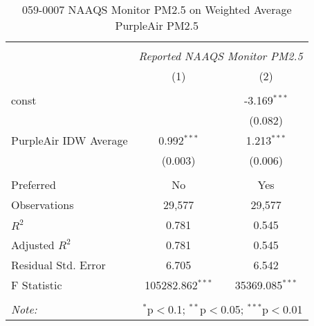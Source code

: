\begin{table}[!htbp] \centering
  \caption{059-0007 NAAQS Monitor PM2.5 on Weighted Average PurpleAir PM2.5}
  \label{tab:reg_059-0007}
\begin{tabular}{@{\extracolsep{5pt}}lcc}
\\[-1.8ex]\hline
\hline \\[-1.8ex]
& \multicolumn{2}{c}{\textit{Reported NAAQS Monitor PM2.5}} \
\cr \cline{2-3}
\\[-1.8ex] & (1) & (2) \\
\hline \\[-1.8ex]
 const & & -3.169$^{***}$ \\
  & & (0.082) \\
 PurpleAir IDW Average & 0.992$^{***}$ & 1.213$^{***}$ \\
  & (0.003) & (0.006) \\
\hline \\[-1.8ex]
 Preferred & No & Yes \\
 Observations & 29,577 & 29,577 \\
 $R^2$ & 0.781 & 0.545 \\
 Adjusted $R^2$ & 0.781 & 0.545 \\
 Residual Std. Error & 6.705 & 6.542  \\
 F Statistic & 105282.862$^{***}$  & 35369.085$^{***}$  \\
\hline
\hline \\[-1.8ex]
\textit{Note:} & \multicolumn{2}{r}{$^{*}$p$<$0.1; $^{**}$p$<$0.05; $^{***}$p$<$0.01} \\
\end{tabular}
\end{table}